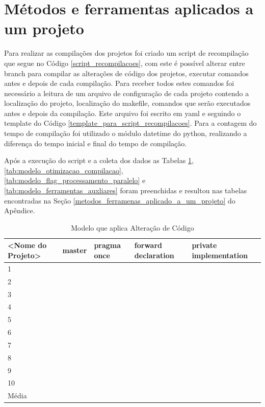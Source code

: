 \section{Métodos e ferramentas aplicados a um projeto}
\label{metodos_ferramentas_aplicados_a_um_projeto_template}

Para realizar as compilações dos projetos foi criado um script de recompilação que
 segue no Código \ref{script_recompilacoes}, com este é possível alterar entre
 branch para compilar as alterações de código dos projetos,
 executar comandos antes e depois de cada compilação.
 Para receber todos estes comandos foi necessário a leitura de um arquivo de
 configuração de cada projeto contendo a localização do projeto,
 localização do makefile, comandos que serão executados antes e depois
 da compilação.
 Este arquivo foi escrito em yaml e seguindo o template do Código
 \ref{template_para_script_recompilacoes}.
Para a contagem do tempo de compilação foi utilizado o módulo datetime do python,
 realizando a diferença do tempo inicial e final do tempo de compilação.

	Após a execução do script e a coleta dos dados as Tabelas \ref{tab:modelo_alteracao_de_codigo},
 \ref{tab:modelo_otimizacao_compilacao}, \ref{tab:modelo_flag_processamento_paralelo} e
\ref{tab:modelo_ferramentas_auxliares} foram preenchidas e resultou nas tabelas encontradas na Seção 
\ref{metodos_ferramenas_aplicado_a_um_projeto} do Apêndice.

\begin{table}[!ht]
\centering
\tiny
\caption{Modelo que aplica Alteração de Código}
\label{tab:modelo_alteracao_de_codigo}
\begin{tabular}{lllll}
\textbf{<Nome do Projeto>} & \textbf{master} & \textbf{pragma once} & \textbf{forward declaration} & \textbf{private implementation}   \\ \toprule
1                             &      &     &     &        \\ 
2                             &      &     &     &        \\ 
3                             &      &     &     &        \\ 
4                             &      &     &     &        \\ 
5                             &      &     &     &        \\ 
6                             &      &     &     &        \\ 
7                             &      &     &     &        \\ 
8                             &      &     &     &        \\ 
9                             &      &     &     &        \\ 
10                            &      &     &     &        \\ \bottomrule
Média                         &      &     &     &        \\ 
\end{tabular}
\end{table}


